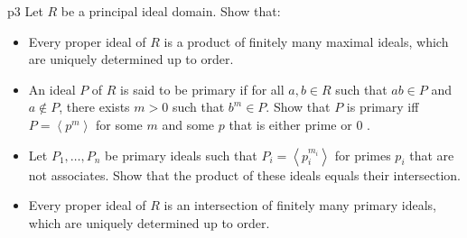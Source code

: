 \documentclass[a4paper, 11pt]{article}
\newcounter{problem}
\begin{document}
\begin{problem}{%
	}{p3%
	}
Let $R$ be a principal ideal domain. Show that:
\begin{itemize}[label=$\bullet$]
	\item  Every proper ideal of $R$ is a product of finitely many maximal ideals, which are uniquely determined up to order.
\item An ideal $P$ of $R$ is said to be primary if for all $a, b \in R$ such that $a b \in P$ and $a \notin P$, there exists $m>0$ such that $b^m \in P$. Show that $P$ is primary iff $P=\left\langle p^m\right\rangle$ for some $m$ and some $p$ that is either prime or 0 .
\item Let $P_1, \ldots, P_n$ be primary ideals such that $P_i=\left\langle p_i^{m_i}\right\rangle$ for primes $p_i$ that are not associates. Show that the product of these ideals equals their intersection.
\item Every proper ideal of $R$ is an intersection of finitely many primary ideals, which are uniquely determined up to order.
\end{itemize}
\end{problem}
\end{document}
